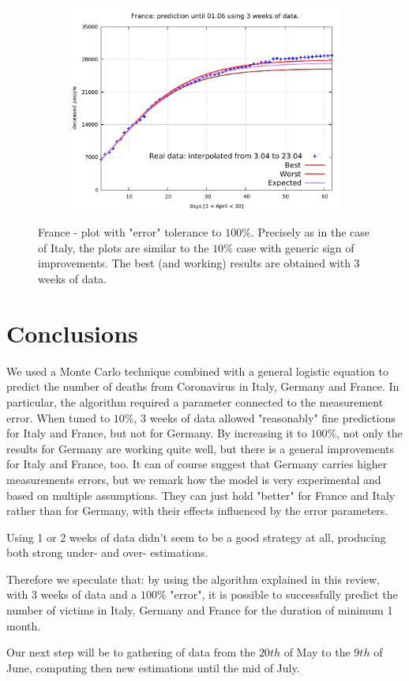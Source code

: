 \documentclass[8pt]{article}
\begin{document}
\begin{figure}[h!]
\begin{subfigure}[b]{0.45\linewidth}
  \includegraphics[width=\linewidth]{../err100p_simulations/fr/3-23/3-23.pdf}
  \end{subfigure}
	\caption{France - plot with "error" tolerance to $100\%$. Precisely
	as in the case of Italy, the plots are similar to the $10\%$ case
	with generic sign of improvements. The best (and working)
	results are obtained with 3 weeks of data.}
\end{figure}


\section{Conclusions}
We used a Monte Carlo technique combined with a general logistic equation
to predict the number of deaths from Coronavirus in Italy, Germany and
France. In particular, the algorithm required a parameter connected
to the measurement error. When tuned to $10\%$, 3 weeks of data allowed
"reasonably" fine predictions for Italy and France, but not for
Germany. By increasing it to $100\%$, not only 
the results for Germany are working quite well,
but there is a general improvements for Italy and France, too.
It can of course suggest that Germany carries higher measurements errors,
but we remark how the model is very
experimental and based on multiple assumptions. They can just
hold "better" for France and Italy rather than for Germany, 
with their effects influenced by the error parameters.


Using 1 or 2 weeks of data
didn't seem to be a good strategy at all, 
producing both strong under- and over- estimations.


Therefore we speculate that: by using the algorithm explained in this review,
with 3 weeks of data and a $100\%$ "error",
it is possible to successfully predict the number of
victims in Italy, Germany and France for the duration of minimum 1 month.


Our next step will be to gathering of data from the $20th$ of May to
the $9th$ of June, computing then new estimations until the mid of
July.
\end{document}
